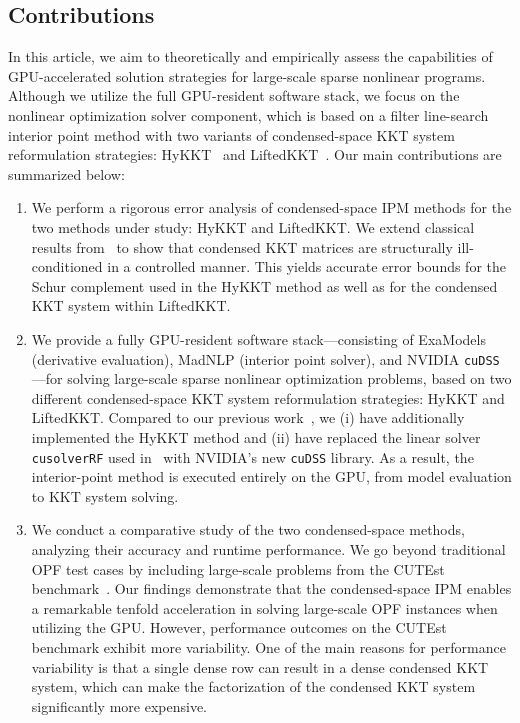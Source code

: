 \subsection{Contributions}
In this article, we aim to theoretically and empirically assess the capabilities of GPU-accelerated solution strategies for large-scale sparse nonlinear programs.
Although we utilize the full GPU-resident software stack, we focus on the nonlinear optimization solver component, which is based on a filter line-search interior point method with two variants of condensed-space KKT system reformulation strategies: HyKKT~\cite{regev2023hykkt} and LiftedKKT~\cite{shin2023accelerating}.
Our main contributions are summarized below:
\begin{enumerate}
\item We perform a rigorous error analysis of condensed-space IPM methods for the two methods under study: HyKKT and LiftedKKT. We extend classical results from~\cite{wright1998ill} to show that condensed KKT matrices are structurally ill-conditioned in a controlled manner. This yields accurate error bounds for the Schur complement used in the HyKKT method as well as for the condensed KKT system within LiftedKKT.
\item We provide a fully GPU-resident software stack---consisting of ExaModels (derivative evaluation), MadNLP (interior point solver), and NVIDIA {\tt cuDSS} ---for solving large-scale sparse nonlinear optimization problems, based on two different condensed-space KKT system reformulation strategies: HyKKT and LiftedKKT. Compared to our previous work~\cite{shin2023accelerating}, we (i) have additionally implemented the HyKKT method and (ii) have replaced the linear solver {\tt cusolverRF} used in~\cite{shin2023accelerating} with NVIDIA's new {\tt cuDSS} library. As a result, the interior-point method is executed entirely on the GPU, from model evaluation to KKT system solving.
\item We conduct a comparative study of the two condensed-space methods, analyzing their accuracy and runtime performance. We go beyond traditional OPF test cases by including large-scale problems from the CUTEst benchmark~\cite{gould2015cutest}. Our findings demonstrate that the condensed-space IPM enables a remarkable tenfold acceleration in solving large-scale OPF instances when utilizing the GPU. However, performance outcomes on the CUTEst benchmark exhibit more variability. One of the main reasons for performance variability is that a single dense row can result in a dense condensed KKT system, which can make the factorization of the condensed KKT system significantly more expensive.

\end{enumerate}
